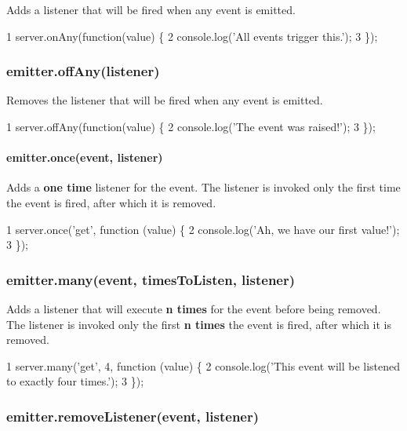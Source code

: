 Adds a listener that will be fired when any event is emitted.


\begin{DoxyCode}
1 server.onAny(function(value) \{
2   console.log('All events trigger this.');
3 \});
\end{DoxyCode}


\subsubsection*{emitter.\+off\+Any(listener)}

Removes the listener that will be fired when any event is emitted.


\begin{DoxyCode}
1 server.offAny(function(value) \{
2   console.log('The event was raised!');
3 \});
\end{DoxyCode}


\paragraph*{emitter.\+once(event, listener)}

Adds a {\bfseries one time} listener for the event. The listener is invoked only the first time the event is fired, after which it is removed.


\begin{DoxyCode}
1 server.once('get', function (value) \{
2   console.log('Ah, we have our first value!');
3 \});
\end{DoxyCode}


\subsubsection*{emitter.\+many(event, times\+To\+Listen, listener)}

Adds a listener that will execute {\bfseries n times} for the event before being removed. The listener is invoked only the first {\bfseries n times} the event is fired, after which it is removed.


\begin{DoxyCode}
1 server.many('get', 4, function (value) \{
2   console.log('This event will be listened to exactly four times.');
3 \});
\end{DoxyCode}


\subsubsection*{emitter.\+remove\+Listener(event, listener)}

